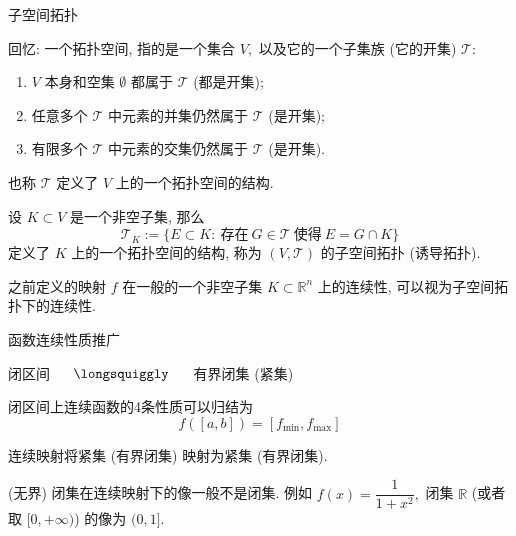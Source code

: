 
\graymode
\begin{frame}{子空间拓扑}

回忆: 一个拓扑空间, 指的是一个集合 $V,$ 以及它的一个子集族 (它的开集) $\mathscr{T}:$
\begin{enumerate}
\item $V$ 本身和空集 $\emptyset$ 都属于 $\mathscr{T}$ (都是开集);
\item 任意多个 $\mathscr{T}$ 中元素的并集仍然属于 $\mathscr{T}$ (是开集);
\item 有限多个 $\mathscr{T}$ 中元素的交集仍然属于 $\mathscr{T}$ (是开集).
\end{enumerate}
也称 $\mathscr{T}$ 定义了 $V$ 上的一个拓扑空间的结构.

\pause
\vspace{1em}

设 $K \subset V$ 是一个非空子集, 那么
\[\mathscr{T}_{K} := \{ E \subset K: ~ \text{存在} ~ G \in \mathscr{T} ~ \text{使得} ~ E = G \cap K \}\]
定义了 $K$ 上的一个拓扑空间的结构, 称为 $(V, \mathscr{T})$ 的子空间拓扑 (诱导拓扑).

\pause
\vspace{1em}

之前定义的映射 $f$ 在一般的一个非空子集 $K \subset \mathbb{R}^n$ 上的连续性, 可以视为子空间拓扑下的连续性.

\end{frame}
\normalmode


\begin{frame}{函数连续性质推广}

闭区间 ~~ $\longsquiggly$ ~~ 有界闭集 (紧集)

\pause
\vspace{1em}

闭区间上连续函数的4条性质可以归结为
\pause
\[f([a, b]) = [f_{\min}, f_{\max}]\]

\pause
\vspace{1em}

\begin{thm}
连续映射将紧集 (有界闭集) 映射为紧集 (有界闭集).
\end{thm}

\pause
\vspace{1em}

\begin{attnblock}
(无界) 闭集在连续映射下的像一般不是闭集. 例如 $f(x) = \dfrac{1}{1 + x^2},$ 闭集 $\mathbb{R}$ (或者取 $[0, +\infty)$) 的像为 $(0, 1].$
\end{attnblock}

\end{frame}

